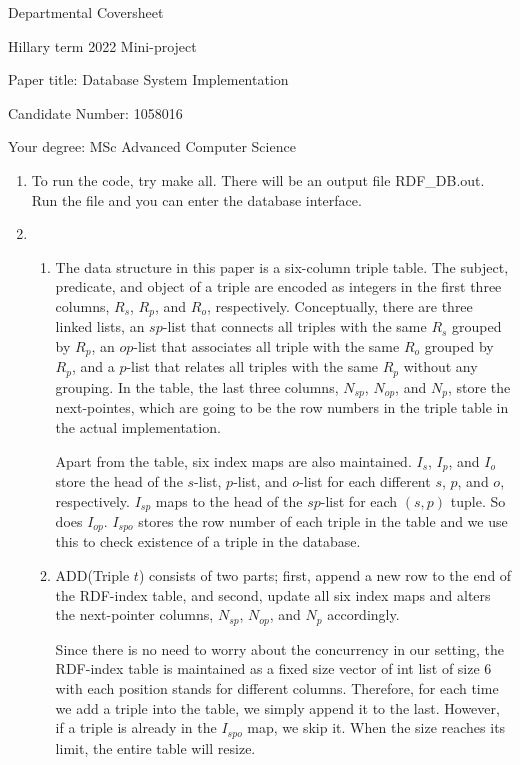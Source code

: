 \documentclass{article}
\begin{document}
Departmental Coversheet

Hillary term 2022
Mini-project

Paper title: Database System Implementation

Candidate Number: 1058016

Your degree: MSc Advanced Computer Science

\newpage

\begin{enumerate}
	\item[] To run the code, try make all. There will be an output file RDF\_DB.out. Run the file and you can enter the database interface.  
	\item 
	\begin{enumerate}
	\item 
	The data structure in this paper is a six-column triple table. The subject, predicate, and object of a triple are encoded as integers in the first three columns, $R_s$, $R_p$, and $R_o$, respectively. Conceptually, there are three linked lists, an $sp$-list that connects all triples with the same $R_s$ grouped by $R_p$, an $op$-list that associates all triple with the same $R_o$ grouped by $R_p$, and a $p$-list that relates all triples with the same $R_p$ without any grouping. In the table, the last three columns, $N_{sp}$, $N_{op}$, and $N_p$, store the next-pointes, which are going to be the row numbers in the triple table in the actual implementation.
	
	Apart from the table, six index maps are also maintained. $I_s$, $I_p$, and $I_o$ store the head of the $s$-list, $p$-list, and $o$-list for each different $s$, $p$, and $o$, respectively. $I_{sp}$ maps to the head of the $sp$-list for each $(s,p)$ tuple. So does $I_{op}$. $I_{spo}$ stores the row number of each triple in the table and we use this to check existence of a triple in the database.
	
	\item {\large A}DD(Triple $t$) consists of two parts; first, append a new row to the end of the RDF-index table, and second, update all six index maps and alters the next-pointer columns, $N_{sp}$, $N_{op}$, and $N_p$ accordingly.
	
	Since there is no need to worry about the concurrency in our setting, the RDF-index table is maintained as a fixed size vector of int list of size 6 with each position stands for different columns. Therefore, for each time we add a triple into the table, we simply append it to the last. However, if a triple is already in the $I_{spo}$ map, we skip it. When the size reaches its limit, the entire table will resize. 


\end{enumerate}
\end{enumerate}
\end{document}
